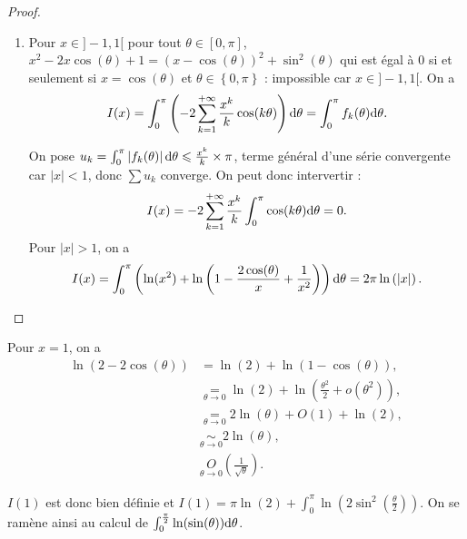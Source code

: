 \documentclass[12pt]{article}
\begin{document}
\begin{proof}
\begin{enumerate}
        \item Pour $x\in]-1,1[$ pour tout $\theta\in[0,\pi]$, $x^{2}-2x\cos(\theta)+1=\left(x-\cos(\theta)\right)^{2}+\sin^{2}(\theta)$ qui est égal à 0 si et seulement si $x=\cos(\theta)$ et $\theta\in\left\lbrace0,\pi\right\rbrace$ : impossible car $x\in]-1,1[$. On a 
        \begin{equation}
            I(x)=\int_{0}^{\pi}\left(-2\sum_{k=1}^{+\infty}\frac{x^{k}}{k}\cos(k\theta)\right)\mathrm{d}\theta=\int_{0}^{\pi}f_k(\theta)\mathrm{d}\theta.
        \end{equation}

        On pose $u_k=\int_{0}^{\pi}\left\lvert f_k(\theta)\right\rvert\mathrm{d}\theta\leqslant\frac{x^{k}}{k}\times\pi$, terme général d'une série convergente car $\left\lvert x\right\rvert<1$, donc $\sum u_{k}$ converge. On peut donc intervertir :
        \begin{equation}
            I(x)=-2\sum_{k=1}^{+\infty}\frac{x^{k}}{k}\int_{0}^{\pi}\cos(k\theta)\mathrm{d}\theta=0.
        \end{equation}
        Pour $\left\lvert x\right\rvert>1$, on a 
        \begin{equation}
            I(x)=\int_{0}^{\pi}\left(\ln(x^{2})+\ln\left(1-\frac{2\cos(\theta)}{x}+\frac{1}{x^{2}}\right)\right)\mathrm{d}\theta=2\pi\ln\left(\left\lvert x\right\rvert\right).
        \end{equation}
    \end{enumerate}
\end{proof}

\begin{remark}
    Pour $x=1$, on a 
    \begin{align}
        \ln(2-2\cos(\theta))
        &=\ln(2)+\ln(1-\cos(\theta)),\\
        &\underset{\theta\to0}{=}\ln(2)+\ln\left(\frac{\theta^{2}}{2}+o(\theta^{2})\right),\\
        &\underset{\theta\to0}{=}2\ln(\theta)+O(1)+\ln(2),\\
        &\underset{\theta\to0}{\sim}2\ln(\theta),\\
        &\underset{\theta\to0}{O}\left(\frac{1}{\sqrt{\theta}}\right).
    \end{align}

    $I(1)$ est donc bien définie et $I(1)=\pi\ln(2)+\int_{0}^{\pi}\ln\left(2\sin^{2}\left(\frac{\theta}{2}\right)\right)$. On se ramène ainsi au calcul de $\int_{0}^{\frac{\pi}{2}}\ln(\sin(\theta))\mathrm{d}\theta$.
\end{remark}
\end{document}

